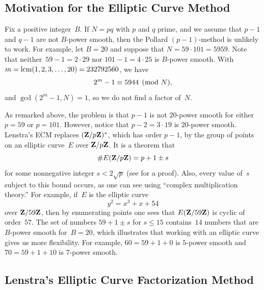\subsection{Motivation for the Elliptic Curve Method}
Fix a positive integer~$B$.  If $N=pq$ with $p$ and $q$ prime, and we
assume that $p-1$ and $q-1$ are not $B$-power smooth, then the Pollard
$(p-1)$-method is unlikely to work.  For example, let $B=20$ and
suppose that $N=59\cdot 101 = 5959$.  Note that
neither~$59-1=2\cdot29$ nor $101-1=4\cdot 25$ is $B$-power smooth.
With $m=\operatorname{lcm}(1,2,3,\ldots,20)=232792560$, we have
$$2^m - 1 \equiv 5944\pmod{N},$$
and $\gcd(2^m-1,N)=1$, so we do not find a factor of~$N$.

As remarked above, the problem is that $p-1$ is not $20$-power smooth for
either $p=59$ or $p=101$.  However, notice that $p-2=3\cdot 19$ is
$20$-power smooth.  Lenstra's ECM  replaces
$(\mathbf{Z}/p\mathbf{Z}{})^*$, which has order $p-1$, by the group of points
on an elliptic curve~$E$ over $\mathbf{Z}/p\mathbf{Z}{}$.
It is a theorem that
$$
 \#E(\mathbf{Z}/p\mathbf{Z}{}) =p+1\pm s
$$
for some nonnegative integer $s<2\sqrt{p}$
(see \cite[\S V.1]{silverman:aec} for a proof).
Also, every value of~$s$ subject to this
bound occurs, as one can see using ``complex multiplication
theory.''
For example, if~$E$ is the elliptic curve
\[
   y^2 = x^3 + x + 54
\]
over $\mathbf{Z}/59\mathbf{Z}{}$, then by enumerating points one sees that
$E(\mathbf{Z}/59\mathbf{Z}{})$ is cyclic of order~$57$.  The set of numbers $59+1\pm
s$ for $s\leq 15$ contains~$14$ numbers that are $B$-power smooth
for~$B=20$, which illustrates that working with an elliptic curve
gives us more flexibility.  For example, $60=59+1+0$ is $5$-power
smooth and $70 = 59+1+10$ is $7$-power smooth.


\subsection{Lenstra's Elliptic Curve Factorization Method}\label{sec:ecm_describe}


